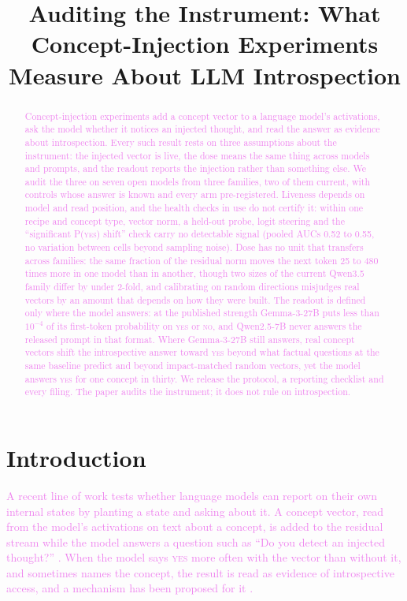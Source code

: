 \documentclass[11pt,a4paper]{article}
\title{Auditing the Instrument: What Concept-Injection Experiments Measure About LLM
Introspection}
\author{}
\date{}
\newcommand{\pyes}{P(\textup{\textsc{yes}})}
\newcommand{\yes}{\textup{\textsc{yes}}}
\newcommand{\no}{\textup{\textsc{no}}}
\newcommand{\draft}[1]{\textcolor{violet}{#1}}
\begin{document}
\maketitle

\begin{abstract}
\draft{Concept-injection experiments add a concept vector to a language model's activations,
ask the model whether it notices an injected thought, and read the answer as evidence about
introspection. Every such result rests on three assumptions about the instrument: the injected
vector is live, the dose means the same thing across models and prompts, and the readout reports
the injection rather than something else. We audit the three on seven open models from three
families, two of them current, with controls
whose answer is known and every arm pre-registered. Liveness depends on model and read position,
and the health checks in use do not certify it: within one recipe and concept type, vector norm,
a held-out probe, logit steering and the ``significant \pyes{} shift'' check carry no detectable
signal (pooled AUCs 0.52 to 0.55, no variation between cells beyond sampling noise).
Dose has no unit that transfers across families: the same fraction of the residual norm moves the
next token 25 to 480 times more in one model than in another, though two sizes of the current Qwen3.5
family differ by under 2-fold, and calibrating on random directions misjudges real
vectors by an amount that depends on how they were built. The readout is defined only where the
model answers: at the published strength Gemma-3-27B puts less than $10^{-4}$ of its first-token
probability on \yes{} or \no{}, and Qwen2.5-7B never answers the released prompt in that format.
Where Gemma-3-27B still answers, real concept vectors shift the introspective answer toward \yes{}
beyond what factual questions at the same baseline predict and beyond impact-matched random
vectors, yet the model answers \yes{} for one concept in thirty. We release the protocol, a
reporting checklist and every filing. The paper audits the instrument; it does not rule on
introspection.}
\end{abstract}

\section{Introduction}
\label{sec:intro}
\draft{A recent line of work tests whether language models can report on their own internal
states by planting a state and asking about it. A concept vector, read from the model's
activations on text about a concept, is added to the residual stream while the model answers a
question such as ``Do you detect an injected thought?'' \citep{lindsey2025introspection}. When the
model says \yes{} more often with the vector than without it, and sometimes names the concept, the
result is read as evidence of introspective access, and a mechanism has been proposed for it
\citep{macar2026mechanisms}.}
\end{document}
